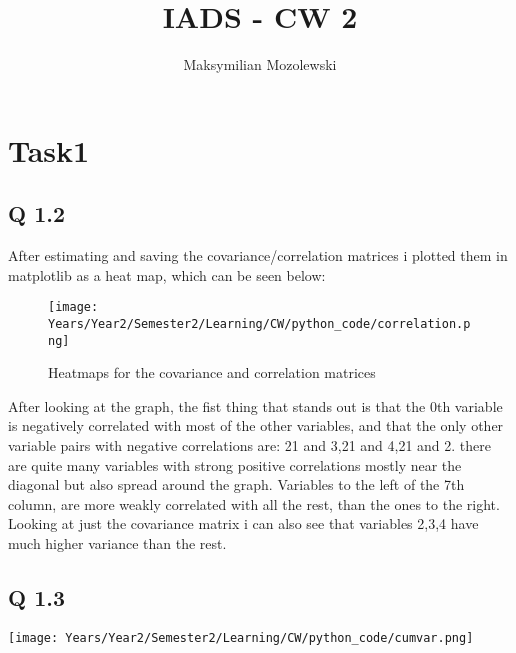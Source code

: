 \documentclass{report}
\begin{document}
\title{IADS - CW 2}
\author{Maksymilian Mozolewski}
\maketitle
\pagebreak
\section{Task1}

\subsection*{Q 1.2}
After estimating and saving the covariance/correlation matrices i plotted them in matplotlib as a heat map, which can be seen below:
\begin{figure}[h]
    \texttt{[image: Years/Year2/Semester2/Learning/CW/python\_code/correlation.png]} 
    \caption{Heatmaps for the covariance and correlation matrices}
\end{figure}
After looking at the graph, the fist thing that stands out is that the 0th variable is negatively correlated with most of the other variables, and that the only other variable pairs with negative correlations are: 21 and 3,21 and 4,21 and 2. there are quite many variables with strong positive correlations mostly near the diagonal but also spread around the graph. Variables to the left of the 7th column, are more weakly correlated with all the rest, than the ones to the right. Looking at just the covariance matrix i can also see that variables 2,3,4 have much higher variance than the rest.
\subsection*{Q 1.3}
{
    \texttt{[image: Years/Year2/Semester2/Learning/CW/python\_code/cumvar.png]}
    \caption{Figure 2: A graph of the cummulative variance of eigenvalues from the dataset}
}
\end{document}
